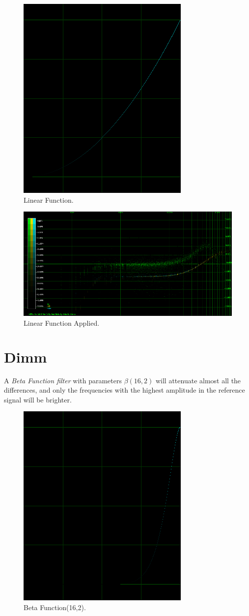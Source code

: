 \documentclass[10pt,a4paper]{report}
\begin{document}
\begin{appendices}
\begin{figure}[H]
	\centering
	\includegraphics[width=0.4\linewidth]{images/colorfilter/BetaFunctionPlot_4.png}
	\caption[Linear]{Linear Function.}
	\label{fig:betafunctionplot4}
\end{figure}

\begin{figure}[H]
	\centering
	\includegraphics[width=1\linewidth]{images/colorfilter/BetaFunctionPlot_4_Data.png}
	\caption[Linear Applied]{Linear Function Applied.}
	\label{fig:betafunctionplot4data}
\end{figure}

\section{Dimm} 

A \textit{Beta Function filter} with parameters $\beta(16,2)$ will attenuate almost all the differences, and only the frequencies with the highest amplitude in the reference signal will be brighter.

\begin{figure}[H]
	\centering
	\includegraphics[width=0.4\linewidth]{images/colorfilter/BetaFunctionPlot_5.png}
	\caption[Beta Function(16,2)]{Beta Function(16,2).}
	\label{fig:betafunctionplot5}
\end{figure}


\end{appendices}
\end{document}
